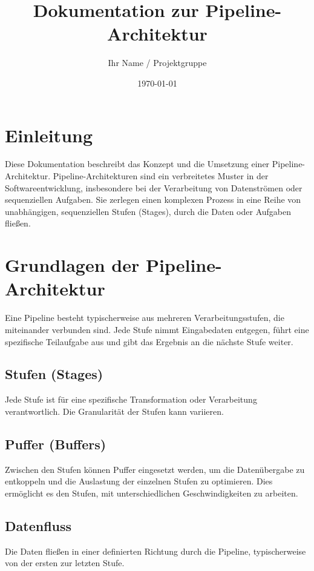\documentclass[a4paper]{article} %
\title{Dokumentation zur Pipeline-Architektur}
\author{Ihr Name / Projektgruppe}
\date{\today}
\begin{document}
\maketitle %
\tableofcontents %
\newpage

\section{Einleitung}
Diese Dokumentation beschreibt das Konzept und die Umsetzung einer Pipeline-Architektur. Pipeline-Architekturen sind ein verbreitetes Muster in der Softwareentwicklung, insbesondere bei der Verarbeitung von Datenströmen oder sequenziellen Aufgaben. Sie zerlegen einen komplexen Prozess in eine Reihe von unabhängigen, sequenziellen Stufen (Stages), durch die Daten oder Aufgaben fließen.
\lipsum[1-2] %

\section{Grundlagen der Pipeline-Architektur}
Eine Pipeline besteht typischerweise aus mehreren Verarbeitungsstufen, die miteinander verbunden sind. Jede Stufe nimmt Eingabedaten entgegen, führt eine spezifische Teilaufgabe aus und gibt das Ergebnis an die nächste Stufe weiter.
\subsection{Stufen (Stages)}
Jede Stufe ist für eine spezifische Transformation oder Verarbeitung verantwortlich. Die Granularität der Stufen kann variieren.
\blindtext

\subsection{Puffer (Buffers)}
Zwischen den Stufen können Puffer eingesetzt werden, um die Datenübergabe zu entkoppeln und die Auslastung der einzelnen Stufen zu optimieren. Dies ermöglicht es den Stufen, mit unterschiedlichen Geschwindigkeiten zu arbeiten.
\blindtext

\subsection{Datenfluss}
Die Daten fließen in einer definierten Richtung durch die Pipeline, typischerweise von der ersten zur letzten Stufe.
\lipsum[3]
\end{document}
